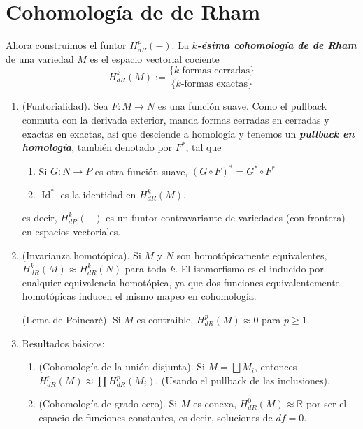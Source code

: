 \documentclass[spanish]{article}
\theoremstyle{definition}
\newcommand{\R}{\mathbb{R}}
\DeclareMathOperator{\Id}{Id}
\begin{document}
	\section{Cohomología de de Rham}\label{sec:3}
	Ahora construimos el funtor $H_{dR}^p(-)$. La \textbf{\textit{$k$-ésima cohomología de de Rham}} de una variedad $M$ es el espacio vectorial cociente
	\[H_{dR}^k(M):=\frac{\{k\text{-formas cerradas}\}}{\{k\text{-formas exactas}\}}\]
	\begin{enumerate}		
		\item (Funtorialidad). Sea  $F:M\to N$ es una función suave. Como el pullback 
		conmuta con la derivada exterior, manda formas cerradas en cerradas y exactas en exactas, así que desciende a homología y tenemos un \textbf{\textit{pullback en homología}}, también denotado por $F^*$, tal que
		\begin{enumerate}
			\item Si $G:N\to P$ es otra función suave, $(G\circ F)^*=G^*\circ F^*$
			\item $\Id^*$ es la identidad en $H_{dR}^k(M)$.
		\end{enumerate}
		es decir, $H_{dR}^k(-)$ es un funtor contravariante de variedades (con frontera) en espacios vectoriales.
		
		\item (Invarianza homotópica). Si $M$ y $N$ son homotópicamente equivalentes, $H_{dR}^k(M)\approx H_{dR}^k(N)$ para toda $k$. El isomorfismo es el inducido por cualquier equivalencia homotópica, ya que dos funciones equivalentemente homotópicas inducen el mismo mapeo en cohomología.
		
		(Lema de Poincaré). Si $M$ es contraible, $H_{dR}^p(M)\approx0$ para $p\geq1$.
		
		\item Resultados básicos:
		\begin{enumerate}
			\item (Cohomología de la unión disjunta). Si $M=\bigsqcup M_i$, entonces $H_{dR}^p(M)\approx \prod H_{dR}^p(M_i)$. (Usando el pullback de las inclusiones).
			
			\item (Cohomología de grado cero). Si $M$ es conexa, $H_{dR}^0(M)\approx\R$ por ser el espacio de funciones constantes, es decir, soluciones de $df=0$.
			

\end{enumerate}
\end{enumerate}
\end{document}
